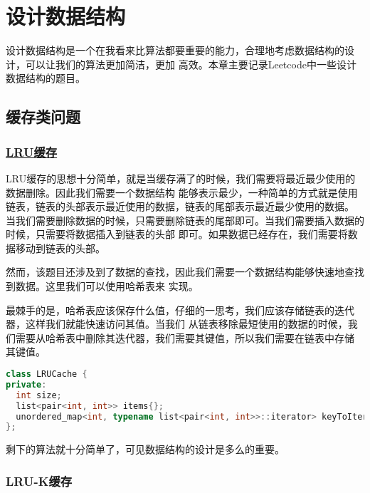 \documentclass[../../main.tex]{subfiles}
\begin{document}
\setchapterpreamble[u]{\margintoc}

\chapter{设计数据结构}

设计数据结构是一个在我看来比算法都要重要的能力，合理地考虑数据结构的设计，可以让我们的算法更加简洁，更加
高效。本章主要记录Leetcode中一些设计数据结构的题目。

\section{缓存类问题}

\subsection{\href{https://leetcode.cn/problems/lru-cache/}{LRU缓存}}
\label{subsec:lru-cache}

LRU缓存的思想十分简单，就是当缓存满了的时候，我们需要将最近最少使用的数据删除。因此我们需要一个数据结构
能够表示最少，一种简单的方式就是使用链表，链表的头部表示最近使用的数据，链表的尾部表示最近最少使用的数据。
当我们需要删除数据的时候，只需要删除链表的尾部即可。当我们需要插入数据的时候，只需要将数据插入到链表的头部
即可。如果数据已经存在，我们需要将数据移动到链表的头部。

然而，该题目还涉及到了数据的查找，因此我们需要一个数据结构能够快速地查找到数据。这里我们可以使用哈希表来
实现。

最棘手的是，哈希表应该保存什么值，仔细的一思考，我们应该存储链表的迭代器，这样我们就能快速访问其值。当我们
从链表移除最短使用的数据的时候，我们需要从哈希表中删除其迭代器，我们需要其键值，所以我们需要在链表中存储
其键值。

\begin{lstlisting}[language=C++,style=kaolstplain]
class LRUCache {
private:
  int size;
  list<pair<int, int>> items{};
  unordered_map<int, typename list<pair<int, int>>::iterator> keyToIterators{};
};
\end{lstlisting}

剩下的算法就十分简单了，可见数据结构的设计是多么的重要。



\subsection{LRU-K缓存}
\end{document}
